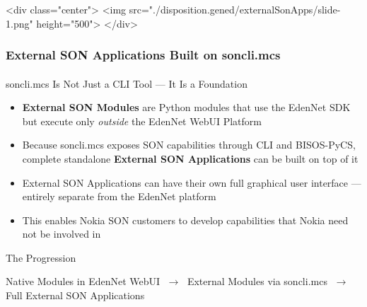 \begin{htmlonly}

\begin{frame}[fragile,plain,label=externalSonApps]
    \frametitle{}
    \framesubtitle{}
    \begin{rawhtml}
<div class="center">
<img src="./disposition.gened/externalSonApps/slide-1.png" height="500">
</div>
    \end{rawhtml}
\end{frame}
\end{htmlonly}

\begin{verblatex}

\begin{frame}[fragile,plain,label=externalSonApps]
    \frametitle{External SON Applications Built on soncli.mcs}
    \framesubtitle{}

    \begin{exampleblock}{soncli.mcs Is Not Just a CLI Tool --- It Is a Foundation}
    \end{exampleblock}

\begin{itemize}
  \item \textbf{External SON Modules} are Python modules that use the EdenNet SDK
        but execute only \textit{outside} the EdenNet WebUI Platform
  \item Because soncli.mcs exposes SON capabilities through CLI and BISOS-PyCS,
        complete standalone \textbf{External SON Applications} can be built on top of it
  \item External SON Applications can have their own full graphical user interface ---
        entirely separate from the EdenNet platform
  \item This enables Nokia SON customers to develop capabilities that
        Nokia need not be involved in
\end{itemize}

    \begin{block}{The Progression}
      \begin{center}
        Native Modules in EdenNet WebUI
        $\;\rightarrow\;$ External Modules via soncli.mcs
        $\;\rightarrow\;$ Full External SON Applications
      \end{center}
    \end{block}


\end{frame}
\end{verblatex}
